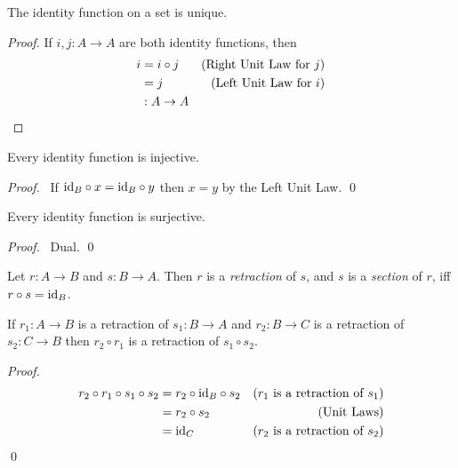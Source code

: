 \begin{prop}
  The identity function on a set is unique.
\end{prop}

\begin{proof}
  \pf If $i, j : A \rightarrow A$ are both identity functions, then
  \begin{align*}
    i & = i \circ j & (\text{Right Unit Law for } j) \\
    & = j & (\text{Left Unit Law for } i) \\
    & : A \rightarrow A & \qed
  \end{align*}
\end{proof}

\begin{prop}
 Every identity function is injective.
\end{prop}

\begin{proof}
  \pf\ If $\id{B} \circ x = \id{B} \circ y$ then $x = y$ by the Left Unit
Law. \qed
\end{proof}

\begin{prop}
Every identity function is surjective.
\end{prop}

\begin{proof}
\pf\ Dual. \qed
\end{proof}

\begin{df}
  Let $r : A \rightarrow B$ and $s : B \rightarrow A$. Then $r$ is a
  \emph{retraction} of $s$, and $s$ is a \emph{section} of $r$, iff $r \circ
  s = \id{B}$.
\end{df}

\begin{prop}
\label{prop:sets:retraction:comp}
If $r_1 : A \rightarrow B$ is a retraction of $s_1 : B \rightarrow A$ and $r_2 : B \rightarrow C$ is a retraction of $s_2 : C \rightarrow B$ then $r_2 \circ r_1$ is a retraction of $s_1 \circ s_2$.
\end{prop}

\begin{proof}
\pf
\begin{align*}
r_2 \circ r_1 \circ s_1 \circ s_2 & = r_2 \circ \id{B} \circ s_2 & (\text{$r_1$ is a retraction of $s_1$}) \\
& = r_2 \circ s_2 & (\text{Unit Laws}) \\
& = \id{C} & (\text{$r_2$ is a retraction of $s_2$})
\end{align*}
\qed
\end{proof}

